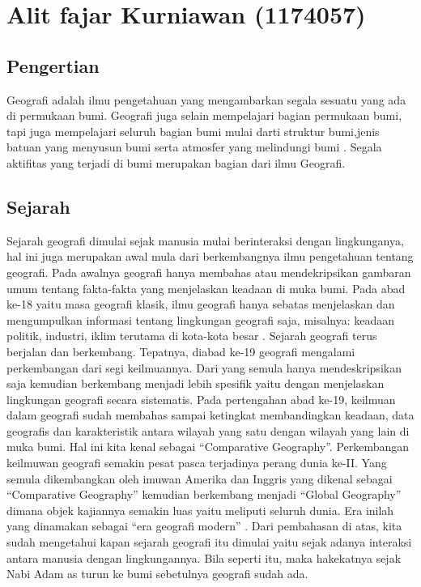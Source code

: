 \section{Alit fajar Kurniawan (1174057)}

\subsection{Pengertian}
Geografi adalah ilmu pengetahuan yang mengambarkan segala sesuatu yang ada di permukaan bumi. \hfill\break
Geografi juga selain mempelajari bagian permukaan bumi, tapi juga mempelajari seluruh bagian bumi mulai darti struktur bumi,jenis batuan yang menyusun bumi serta atmosfer yang melindungi bumi \cite{widiani2018efektivitas}. \hfill\break
Segala aktifitas yang terjadi di bumi merupakan bagian dari ilmu Geografi.\hfill\break
\subsection{Sejarah}
Sejarah geografi dimulai sejak manusia mulai berinteraksi dengan lingkunganya, hal ini juga merupakan awal mula dari berkembangnya ilmu pengetahuan tentang geografi.\hfill\break
Pada awalnya geografi hanya membahas atau mendekripsikan gambaran umum tentang fakta-fakta yang menjelaskan keadaan di muka bumi. Pada abad ke-18 yaitu masa geografi klasik, ilmu geografi hanya sebatas menjelaskan dan mengumpulkan informasi tentang lingkungan geografi saja, misalnya: keadaan politik, industri, iklim terutama di kota-kota besar \cite{zuhdi2018sejarah}.\hfill\break
Sejarah geografi terus berjalan dan berkembang. Tepatnya, diabad ke-19 geografi mengalami perkembangan dari segi keilmuannya. Dari yang semula hanya mendeskripsikan saja kemudian berkembang menjadi lebih spesifik yaitu dengan menjelaskan lingkungan geografi secara sistematis.\hfill\break
Pada pertengahan abad ke-19, keilmuan dalam geografi sudah membahas sampai ketingkat membandingkan keadaan, data geografis dan karakteristik antara wilayah yang satu dengan wilayah yang lain di muka bumi. Hal ini kita kenal sebagai “Comparative Geography”.\hfill\break
Perkembangan keilmuwan geografi semakin pesat pasca terjadinya perang dunia ke-II. Yang semula dikembangkan oleh imuwan Amerika dan Inggris yang dikenal sebagai “Comparative Geography” kemudian berkembang menjadi “Global Geography” dimana objek kajiannya semakin luas yaitu meliputi seluruh dunia. Era inilah yang dinamakan sebagai “era geografi modern” \cite{lambert2018geography}.\hfill\break
Dari pembahasan di atas, kita sudah mengetahui kapan sejarah geografi itu dimulai yaitu sejak adanya interaksi antara manusia dengan lingkungannya. Bila seperti itu, maka hakekatnya sejak Nabi Adam as turun ke bumi sebetulnya geografi sudah ada.\hfill\break
